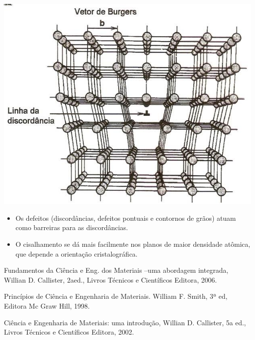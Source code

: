 \includegraphics[scale=0.4,trim={0 0 0 0}]{figures/defLinhas}

\begin{itemize}
	\item Os defeitos (discordâncias, defeitos pontuais e contornos de grãos) atuam como barreiras para as discordâncias.
	\item O cisalhamento se dá mais facilmente nos planos de maior densidade atômica, que depende a orientação cristalográfica.
\end{itemize}


Fundamentos da Ciência e Eng. dos Materiais –uma abordagem integrada, Willian D. Callister, 2aed., Livros Técnicos e Científicos Editora, 2006.

Princípios de Ciência e Engenharia de Materiais. William F. Smith, 3ª ed, Editora Mc Graw Hill, 1998.

Ciência e Engenharia de Materiais: uma introdução, Willian D. Callister, 5a ed., Livros Técnicos e Científicos Editora, 2002.

